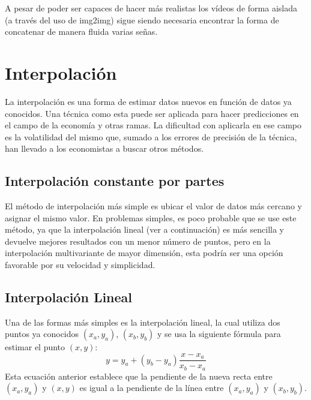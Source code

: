 A pesar de poder ser capaces de hacer más realistas los vídeos de forma aislada (a través del uso de img2img) sigue siendo necesaria encontrar la forma de concatenar de manera fluida varias señas.

\section{Interpolación}\label{section:state-of-the-art:interpolation}
La interpolación es una forma de estimar datos nuevos en función de datos ya conocidos. Una técnica como esta puede ser aplicada para hacer predicciones en el campo de la economía y otras ramas. La dificultad con aplicarla en ese campo es la volatilidad del mismo que, sumado a los errores de precisión de la técnica, han llevado a los economistas a buscar otros métodos.\\

\subsection{Interpolación constante por partes}

El método de interpolación más simple es ubicar el valor de datos más cercano y asignar el mismo valor. En problemas simples, es poco probable que se use este método, ya que la interpolación lineal (ver a continuación) es más sencilla y devuelve mejores resultados con un menor número de puntos, pero en la interpolación multivariante de mayor dimensión, esta podría ser una opción favorable por su velocidad y simplicidad.


\subsection{Interpolación Lineal}
Una de las formas más simples es la interpolación lineal, la cual utiliza dos puntos ya conocidos $\left(x_{a}, y_{a} \right) $, $\left( x_{b}, y_{b}\right) $  y se usa la siguiente fórmula para estimar el punto $\left( x, y\right) $:
\begin{equation}
y = y_{a} + \left( y_{b} - y_{a}\right) \frac{x - x_{a}}{x_{b}-x_{a}}
\end{equation}
Esta ecuación anterior establece que la pendiente de la nueva recta entre $ \left(x_{a},y_{a}\right)$ y $\left(x ,y \right)$ es igual a la pendiente de la línea entre $\left(x_{a},y_{a}\right)$ y $\left(x_{b},y_{b}\right)$.\\

